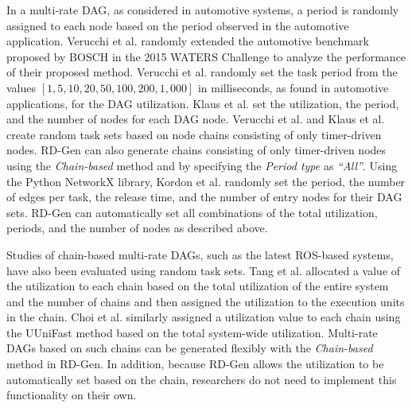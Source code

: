 In a multi-rate DAG, as considered in automotive systems, a period is randomly assigned to each node based on the period observed in the automotive application.
Verucchi et al. \cite{verucchi2020latency} randomly extended the automotive benchmark proposed by BOSCH in the 2015 WATERS Challenge \cite{kramer2015real} to analyze the performance of their proposed method.
Verucchi et al. randomly set the task period from the values $[1, 5, 10, 20, 50, 100, 200, 1,000]$ in milliseconds, as found in automotive applications, for the DAG utilization.
Klaus et al. \cite{klaus2021constrained} set the utilization, the period, and the number of nodes for each DAG node.
Verucchi et al. and Klaus et al. create random task sets based on node chains consisting of only timer-driven nodes.
RD-Gen can also generate chains consisting of only timer-driven nodes using the {\it Chain-based} method and by specifying the {\it Period type} as {\it “All”}.
Using the Python NetworkX library, Kordon et al. \cite{kordon2020evaluation} randomly set the period, the number of edges per task, the release time, and the number of entry nodes for their DAG sets.
RD-Gen can automatically set all combinations of the total utilization, periods, and the number of nodes as described above.

Studies of chain-based multi-rate DAGs, such as the latest ROS-based systems, have also been evaluated using random task sets.
Tang et al. \cite{tang2020response} allocated a value of the utilization to each chain based on the total utilization of the entire system and the number of chains and then assigned the utilization to the execution units in the chain.
Choi et al. \cite{choi2021picas} similarly assigned a utilization value to each chain using the UUniFast method based on the total system-wide utilization.
Multi-rate DAGs based on such chains can be generated flexibly with the {\it Chain-based} method in RD-Gen.
In addition, because RD-Gen allows the utilization to be automatically set based on the chain, researchers do not need to implement this functionality on their own.
